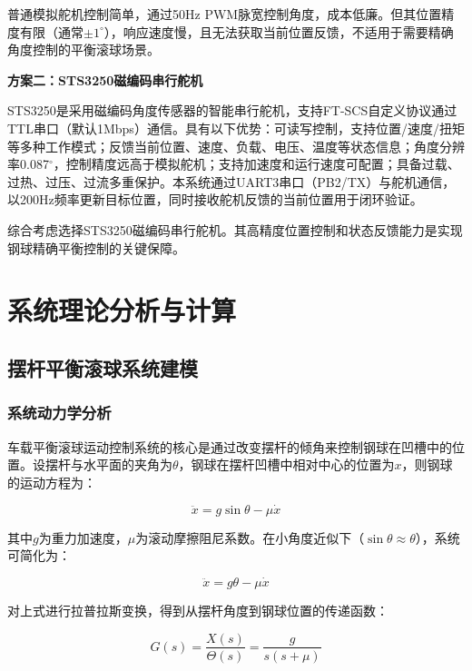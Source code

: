 \documentclass[12pt,a4paper]{ctexart}
\begin{document}
普通模拟舵机控制简单，通过50Hz PWM脉宽控制角度，成本低廉。但其位置精度有限（通常$\pm1^\circ$），响应速度慢，且无法获取当前位置反馈，不适用于需要精确角度控制的平衡滚球场景。

\textbf{方案二：STS3250磁编码串行舵机}

STS3250是采用磁编码角度传感器的智能串行舵机，支持FT-SCS自定义协议通过TTL串口（默认1Mbps）通信。具有以下优势：可读写控制，支持位置/速度/扭矩等多种工作模式；反馈当前位置、速度、负载、电压、温度等状态信息；角度分辨率0.087$^\circ$，控制精度远高于模拟舵机；支持加速度和运行速度可配置；具备过载、过热、过压、过流多重保护。本系统通过UART3串口（PB2/TX）与舵机通信，以200Hz频率更新目标位置，同时接收舵机反馈的当前位置用于闭环验证。

综合考虑选择STS3250磁编码串行舵机。其高精度位置控制和状态反馈能力是实现钢球精确平衡控制的关键保障。

\section{\textbf{系统理论分析与计算}}

\subsection{\textbf{摆杆平衡滚球系统建模}}

\subsubsection{\textbf{系统动力学分析}}

车载平衡滚球运动控制系统的核心是通过改变摆杆的倾角来控制钢球在凹槽中的位置。设摆杆与水平面的夹角为$\theta$，钢球在摆杆凹槽中相对中心的位置为$x$，则钢球的运动方程为：

\begin{equation}
\ddot{x} = g\sin\theta - \mu\dot{x}
\end{equation}

其中$g$为重力加速度，$\mu$为滚动摩擦阻尼系数。在小角度近似下（$\sin\theta \approx \theta$），系统可简化为：

\begin{equation}
\ddot{x} = g\theta - \mu\dot{x}
\end{equation}

对上式进行拉普拉斯变换，得到从摆杆角度到钢球位置的传递函数：

\begin{equation}
G(s) = \frac{X(s)}{\Theta(s)} = \frac{g}{s(s + \mu)}
\end{equation}
\end{document}
